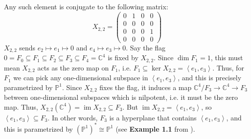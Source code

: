 \documentclass[11pt]{article}
\newcommand{\C}{\mathbb{C}}
\newcommand{\bP}{\mathbb{P}}
\newcommand{\image}{\operatorname{im}}
\theoremstyle{definition}
\numberwithin{equation}{section} %
\begin{document}
\begin{example}
    Any such element is conjugate to the following matrix:
    $$
    X_{2,2} = \begin{pmatrix} 0 & 1 & 0 & 0 \\ 0 & 0 & 0 & 0 \\ 0 & 0 & 0 & 1 \\ 0 & 0 & 0 & 0 \end{pmatrix}
    $$
    $X_{2,2}$ sends $e_2\mapsto e_1\mapsto 0$ and $e_4\mapsto e_3 \mapsto 0$. Say the flag $0=F_0\subseteq F_1\subseteq F_2\subseteq F_3\subseteq F_4 = \C^4$ is fixed by $X_{2,2}$. Since $\dim F_1 = 1$, this must mean $X_{2,2}$ acts as the zero map on $F_1$, i.e. $F_1\subseteq \ker X_{2,2} = \left\langle e_1, e_3\right\rangle$. Thus, for $F_1$ we can pick any one-dimensional subspace in $\left\langle e_1, e_3\right\rangle$, and this is precisely parametrized by $\bP^1$. Since $X_{2,2}$ fixes the flag, it induces a map $\C^4/F_3 \to \C^4\to F_3$ between one-dimensional subspaces which is nilpotent, i.e. it must be the zero map. Thus, $X_{2,2}\left(\C^4\right) = \image X_{2,2} \subseteq F_3$. But $\image X_{2,2} = \left\langle e_1, e_3\right\rangle$, so $\left\langle e_1, e_3\right\rangle\subseteq F_3$. In other words, $F_3$ is a hyperplane that contains $\left\langle e_1, e_3\right\rangle$, and this is parametrized by $\left(\bP^1\right)^* \cong \bP^1$ (see \textbf{Example 1.1} from \cite{Harris1992AlgebraicGeometryFirstCourse}).

    \smallskip


\end{example}
\end{document}
